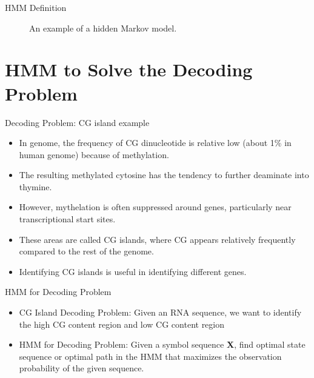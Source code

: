\documentclass{beamer}
\begin{document}
\begin{frame}{HMM Definition}
	\begin{figure}
		\centering
		\caption{An example of a hidden Markov model.}
		\label{fig:HiddenMarkov}
	\end{figure}
\end{frame}
\section{HMM to Solve the Decoding Problem}
\begin{frame}{Decoding Problem: CG island example}
	\begin{itemize}
		\item In genome, the frequency of CG dinucleotide is relative low (about 1\% in human genome) because of methylation. 
		\item The resulting methylated cytosine has the tendency to further deaminate into thymine.
		\item However, mythelation is often suppressed around genes, particularly near transcriptional start sites.
		\item These areas are called CG islands, where CG appears relatively frequently compared to the rest of the genome.
		\item Identifying CG islands is useful in identifying different genes.
	\end{itemize}
\end{frame}

\begin{frame}{HMM for Decoding Problem}
	\begin{itemize}
		\item CG Island Decoding Problem: Given an RNA sequence, we want to identify the high CG content region and low CG content region
		\item HMM for Decoding Problem: Given a symbol sequence \textbf{X}, find optimal state sequence or optimal path in the HMM that maximizes the observation probability of the given sequence.
	\end{itemize}
\end{frame}
\end{document}
